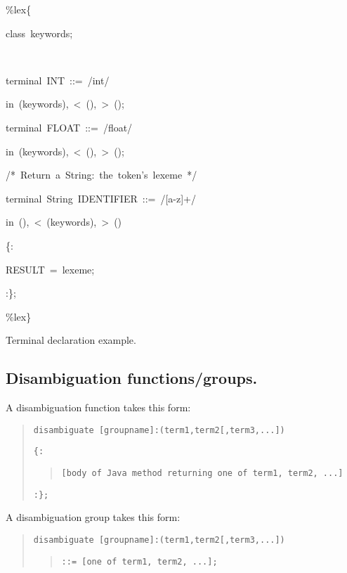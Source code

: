 \documentclass[12pt,english,twoside]{report}
\newenvironment{codeblock}
{\begin{list}{}{
\setlength{\rightmargin}{\leftmargin}
\setlength{\listparindent}{0pt}%
\raggedright
\setlength{\itemsep}{0pt}
\setlength{\parsep}{0pt}
\normalfont\ttfamily}%
 \item[]}
{\end{list}}
\begin{document}
%
\begin{algorithm}
\begin{codeblock}
\%lex\{
\begin{codeblock}
class~keywords;

~

terminal~INT~::=~/int/
\begin{codeblock}
in~(keywords),~<~(),~>~();
\end{codeblock}
terminal~FLOAT~::=~/float/
\begin{codeblock}
in~(keywords),~<~(),~>~();
\end{codeblock}
/{*}~Return~a~String:~the~token's~lexeme~{*}/

terminal~String~IDENTIFIER~::=~/{[}a-z]+/
\begin{codeblock}
in~(),~<~(keywords),~>~()
\end{codeblock}
\{:
\begin{codeblock}
RESULT~=~lexeme;
\end{codeblock}
:\};
\end{codeblock}
\%lex\}
\end{codeblock}

\caption{\label{alg:Terminal-declaration-example.}Terminal declaration example.}
\end{algorithm}



\subsection{\label{sub:Disambiguation-functions.}Disambiguation functions/groups.}

A disambiguation function takes this form:

\begin{quote}
\texttt{disambiguate {[}groupname]:(term1,term2{[},term3,...])}

\texttt{\{:}
\begin{quote}
\texttt{{[}body of Java method returning one of term1, term2, ...]}
\end{quote}
\texttt{:\};}
\end{quote}
A disambiguation group takes this form:

\begin{quote}
\texttt{disambiguate {[}groupname]:(term1,term2{[},term3,...])}
\begin{quote}
\texttt{::= {[}one of term1, term2, ...];}
\end{quote}
\end{quote}
\end{document}
